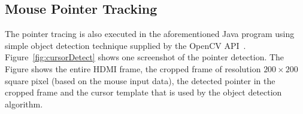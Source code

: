 \subsection{Mouse Pointer Tracking}
The pointer tracing is also executed in the aforementioned Java program using simple object detection technique supplied by the OpenCV API~\cite{opencv}. Figure~\ref{fig:cursorDetect} shows one screenshot of the pointer detection. The Figure shows the entire HDMI frame, the cropped frame of resolution $200 \times 200$ square pixel (based on the mouse input data), the detected pointer in the cropped frame and the cursor template that is used by the object detection algorithm.



